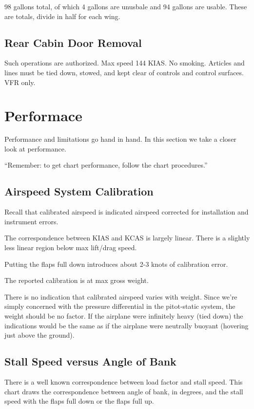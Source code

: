 98 gallons total, of which 4 gallons are unusbale and 94 gallons are usable. These are totals, divide in half for each wing.

\subsection{Rear Cabin Door Removal}

Such operations are authorized. Max speed 144 KIAS. No smoking. Articles and lines must be tied down, stowed, and kept clear of controls and control surfaces. VFR only.


\section{Performace}

Performance and limitations go hand in hand. In this section we take a closer look at performance.

``Remember: to get chart performance, follow the chart procedures.''

\subsection{Airspeed System Calibration}

Recall that calibrated airspeed is indicated airspeed corrected for installation and instrument errors.

The correspondence between KIAS and KCAS is largely linear. There is a slightly less linear region below max lift/drag speed.

Putting the flaps full down introduces about 2-3 knots of calibration error.

The reported calibration is at max gross weight.

There is no indication that calibrated airspeed varies with weight. Since we're simply concerned with the pressure differential in the pitot-static system, the weight should be no factor. If the airplane were infinitely heavy (tied down) the indications would be the same as if the airplane were neutrally buoyant (hovering just above the ground).

\subsection{Stall Speed versus Angle of Bank}

There is a well known correspondence between load factor and stall speed. This chart draws the correspondence between angle of bank, in degrees, and the stall speed with the flaps full down or the flaps full up.

